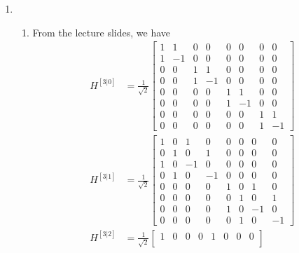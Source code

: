 \documentclass[11pt,a4paper]{article}
\begin{document}
\begin{enumerate}
    \item
          \begin{enumerate}
              \item From the lecture slides, we have
                    \begin{align*}
                        H^{[3|0]} & = \frac{1}{\sqrt{2}}
                        \begin{bmatrix}
                            1 & 1  & 0 & 0  & 0 & 0  & 0 & 0  \\
                            1 & -1 & 0 & 0  & 0 & 0  & 0 & 0  \\
                            0 & 0  & 1 & 1  & 0 & 0  & 0 & 0  \\
                            0 & 0  & 1 & -1 & 0 & 0  & 0 & 0  \\
                            0 & 0  & 0 & 0  & 1 & 1  & 0 & 0  \\
                            0 & 0  & 0 & 0  & 1 & -1 & 0 & 0  \\
                            0 & 0  & 0 & 0  & 0 & 0  & 1 & 1  \\
                            0 & 0  & 0 & 0  & 0 & 0  & 1 & -1
                        \end{bmatrix} \\
                        H^{[3|1]} & = \frac{1}{\sqrt{2}}
                        \begin{bmatrix}
                            1 & 0 & 1  & 0  & 0 & 0 & 0  & 0  \\
                            0 & 1 & 0  & 1  & 0 & 0 & 0  & 0  \\
                            1 & 0 & -1 & 0  & 0 & 0 & 0  & 0  \\
                            0 & 1 & 0  & -1 & 0 & 0 & 0  & 0  \\
                            0 & 0 & 0  & 0  & 1 & 0 & 1  & 0  \\
                            0 & 0 & 0  & 0  & 0 & 1 & 0  & 1  \\
                            0 & 0 & 0  & 0  & 1 & 0 & -1 & 0  \\
                            0 & 0 & 0  & 0  & 0 & 1 & 0  & -1
                        \end{bmatrix} \\
                        H^{[3|2]} & = \frac{1}{\sqrt{2}}
                        \begin{bmatrix}
                            1 & 0 & 0 & 0 & 1  & 0  & 0  & 0  \\

\end{bmatrix}
\end{align*}
\end{enumerate}
\end{enumerate}
\end{document}
